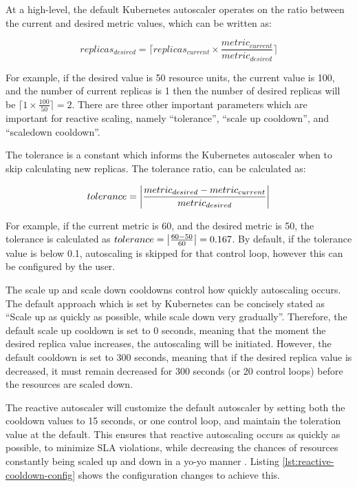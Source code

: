 At a high-level, the default Kubernetes autoscaler operates on the ratio between the current and desired metric values, which can be written as:

\[ replicas_{desired} = \lceil replicas_{current} \times \frac{metric_{current}}{metric_{desired}}\rceil\]

For example, if the desired value is 50 resource units, the current value is 100, and the number of current replicas is 1 then the number of desired replicas will be $\lceil 1 \times \frac{100}{50}\rceil = 2$. There are three other important parameters which are important for reactive scaling, namely ``tolerance'', ``scale up cooldown'', and ``scaledown cooldown''.\par

The tolerance is a constant which informs the Kubernetes autoscaler when to skip calculating new replicas. The tolerance ratio, can be calculated as:

\[ tolerance = \abs{ \frac{metric_{desired} - metric_{current}}{metric_{desired}} }\]

For example, if the current metric is 60, and the desired metric is 50, the tolerance is calculated as $ tolerance = \abs{ \frac{60 - 50}{60}} = 0.167$. By default, if the tolerance value is below 0.1, autoscaling is skipped for that control loop, however this can be configured by the user.\par

The scale up and scale down cooldowns control how quickly autoscaling occurs. The default approach which is set by Kubernetes can be concisely stated as ``Scale up as quickly as possible, while scale down very gradually''. Therefore, the default scale up cooldown is set to 0 seconds, meaning that the moment the desired replica value increases, the autoscaling will be initiated. However, the default cooldown is set to 300 seconds, meaning that if the desired replica value is decreased, it must remain decreased for 300 seconds (or 20 control loops) before the resources are scaled down.\par

The reactive autoscaler will customize the default autoscaler by setting both the cooldown values to 15 seconds, or one control loop, and maintain the toleration value at the default. This ensures that reactive autoscaling occurs as quickly as possible, to minimize SLA violations, while decreasing the chances of resources constantly being scaled up and down in a yo-yo manner \cite{sides2015yo}. Listing \ref{lst:reactive-cooldown-config} shows the configuration changes to achieve this.\par


